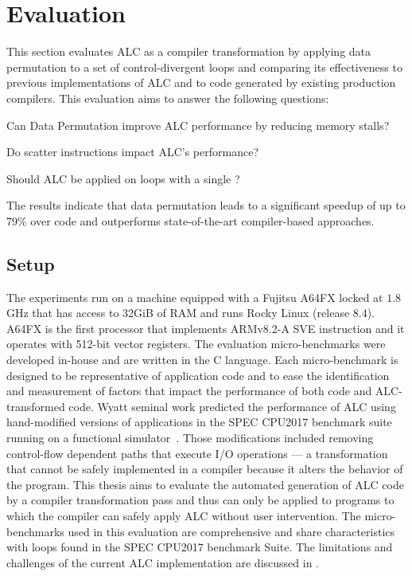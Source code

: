 \newpage
\chapter{Evaluation}
\label{chap:evaluation}

This section evaluates ALC as a compiler transformation by applying data permutation to a set of control-divergent loops and comparing its effectiveness to previous implementations of ALC and to code generated by existing production compilers. 
This evaluation aims to answer the following questions:

\noindent{} Can Data Permutation improve ALC performance by reducing memory stalls?

\noindent{} Do scatter instructions impact ALC's performance?

\noindent{} Should ALC be applied on loops with a single \cpath?

The results indicate that data permutation leads to a significant speedup of up to 79\% over \ifconverted code and outperforms state-of-the-art compiler-based approaches.

\section{Setup}
\label{sec:setup}

The experiments run on a machine equipped with a Fujitsu A64FX locked at $1.8$GHz that has access to 32GiB of RAM and runs Rocky Linux (release 8.4).
A64FX is the first processor that implements ARMv8.2-A SVE instruction and it operates with 512-bit vector registers.
The evaluation micro-benchmarks were developed in-house and are written in the C language.
Each micro-benchmark is designed to be representative of application code and to ease the identification and measurement of factors that impact the performance of both \ifconverted code and ALC-transformed code.
Wyatt \etal seminal work predicted the performance of ALC using hand-modified versions of applications in the SPEC CPU2017 benchmark suite running on a functional simulator~\cite{spec}.
Those modifications included removing control-flow dependent paths that execute I/O operations --- a transformation that cannot be safely implemented in a compiler because it alters the behavior of the program.
This thesis aims to evaluate the automated generation of ALC code by a compiler transformation pass and thus can only be applied to programs to which the compiler can safely apply ALC without user intervention.
The micro-benchmarks used in this evaluation are comprehensive and share characteristics with loops found in the SPEC CPU2017 benchmark Suite.
The limitations and challenges of the current ALC implementation are discussed in .

